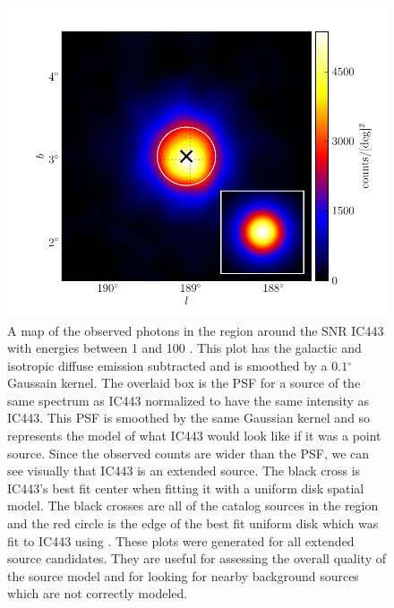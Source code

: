 \documentclass[12pt,preprint]{aastex}
\newcommand{\gev}{\text{GeV}\xspace}
\renewcommand{\deg}{\ensuremath{^\circ}\xspace}
\newcommand{\pointlike}{\text{\em pointlike}\xspace}
\begin{document}
\clearpage
\begin{figure}
  \begin{center}
    \includegraphics{ic443_plots/ic443_smoothed_counts.pdf}
    \caption{A map of the observed photons in the region around the SNR
    IC443 with energies between 1 \gev and 100 \gev.  This plot has the
    galactic and isotropic diffuse emission subtracted and is smoothed
    by a $0.1\deg$ Gaussain kernel.  The overlaid box is the PSF for
    a source of the same spectrum as IC443 normalized to have the same
    intensity as IC443.  This PSF is smoothed by the same Gaussian kernel
    and so represents the model of what IC443 would look like if it was
    a point source. Since the observed counts are wider than the PSF,
    we can see visually that IC443 is an extended source.  The black
    cross is IC443's best fit center when fitting it with a uniform
    disk spatial model. The
    black crosses are all of the catalog sources in
    the region and the red circle is the edge of the best fit
    uniform disk which was fit to IC443 using \pointlike.  These plots
    were generated for all extended source candidates.  They are useful
    for assessing the overall quality of the source model and for looking
    for nearby background sources which are not correctly modeled.}
    \label{smoothed_counts}
  \end{center}
\end{figure}
\end{document}

